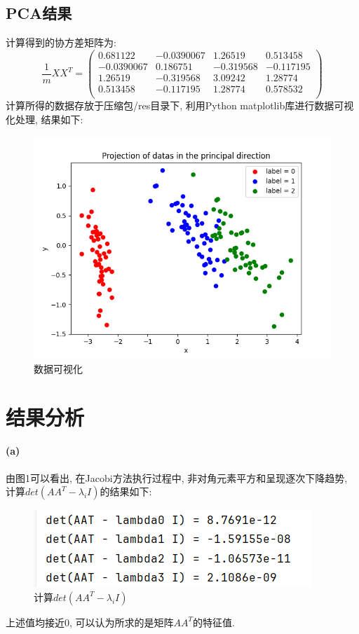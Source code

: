 \documentclass[12pt,a4paper,oneside]{article}
\begin{document}
\subsection{PCA结果}
计算得到的协方差矩阵为:
$$\frac{1}{m}XX^T = 
\left(
    \begin{matrix}
        0.681122& -0.0390067& 1.26519& 0.513458\\
        -0.0390067& 0.186751& -0.319568& -0.117195\\ 
        1.26519& -0.319568& 3.09242& 1.28774\\ 
        0.513458& -0.117195& 1.28774& 0.578532\\
    \end{matrix}
\right)
$$
计算所得的数据存放于压缩包/res目录下, 利用Python matplotlib库进行数据可视化处理, 结果如下:
\begin{figure}[H]
    \centering
    \includegraphics{figs/data.png}
    \caption{数据可视化}
\end{figure}

\section{结果分析}
\paragraph{(a)}  由图1可以看出, 在Jacobi方法执行过程中, 非对角元素平方和呈现逐次下降趋势,
计算$det(AA^T - \lambda_i I)$的结果如下:
\begin{figure}[H]
    \centering
    \includegraphics{figs/det.png}
    \caption{计算$det(AA^T - \lambda_i I)$}
\end{figure}
\noindent 上述值均接近0, 可以认为所求的是矩阵$AA^T$的特征值.
\end{document}
